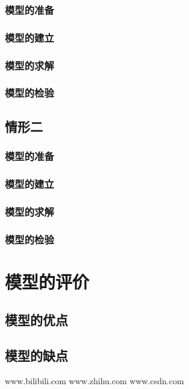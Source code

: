 \documentclass[]{article}
\begin{document}
\subsubsection{模型的准备}
\subsubsection{模型的建立}
\subsubsection{模型的求解}
\subsubsection{模型的检验}

\subsection{情形二}
\subsubsection{模型的准备}
\subsubsection{模型的建立}
\subsubsection{模型的求解}
\subsubsection{模型的检验}

\section{模型的评价}
\subsection{模型的优点}
\subsection{模型的缺点}

\begin{thebibliography}{99}
     www.bilibili.com
     www.zhihu.com 
     www.csdn.com
\end{thebibliography}
\end{document}
